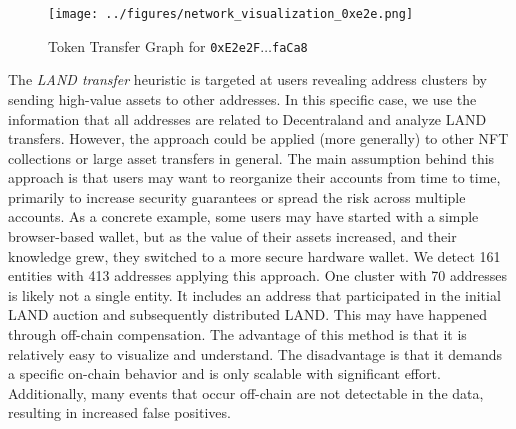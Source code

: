 \documentclass[12pt,a4paper,titlepage,oneside,english]{article}
\begin{document}
\begin{figure}[h!]
	\centering
	\texttt{[image: ../figures/network\_visualization\_0xe2e.png]}
	\caption{Token Transfer Graph for \texttt{0xE2e2F$\dots$faCa8}}
	\label{fig:cluster}
\end{figure}

The \textit{LAND transfer} heuristic is targeted at users revealing address clusters by sending high-value assets to other addresses. In this specific case, we use the information that all addresses are related to Decentraland and analyze LAND transfers. However, the approach could be applied (more generally) to other NFT collections or large asset transfers in general. \newline
The main assumption behind this approach is that users may want to reorganize their accounts from time to time, primarily to increase security guarantees or spread the risk across multiple accounts. As a concrete example, some users may have started with a simple browser-based wallet, but as the value of their assets increased, and their knowledge grew, they switched to a more secure hardware wallet. We detect 161 entities with 413 addresses applying this approach. One cluster with 70 addresses is likely not a single entity. It includes an address that participated in the initial LAND auction and subsequently distributed LAND. This may have happened through off-chain compensation. The advantage of this method is that it is relatively easy to visualize and understand. The disadvantage is that it demands a specific on-chain behavior and is only scalable with significant effort. Additionally, many events that occur off-chain are not detectable in the data, resulting in increased false positives. 
\end{document}
